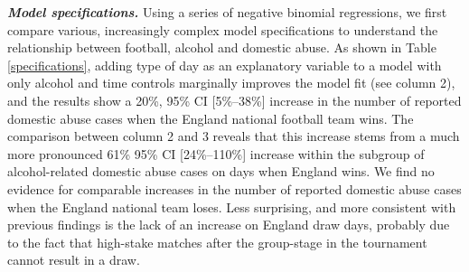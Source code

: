\documentclass[12pt, a4paper]{article}
\begin{document}
\textbf{\textit{Model specifications.}} Using a series of negative binomial regressions, we first compare various, increasingly complex model specifications to understand the relationship between football, alcohol and domestic abuse.  As shown in Table \ref{specifications}, adding type of day as an explanatory variable to a model with only alcohol and time controls marginally improves the model fit (see column 2), and the results show a 20\%, 95\% CI [5\%--38\%] increase in the number of reported domestic abuse cases when the England national football team wins. The comparison between column 2 and 3 reveals that this increase stems from a much more pronounced 61\% 95\% CI [24\%--110\%] increase within the subgroup of alcohol-related domestic abuse cases on days when England wins. We find no evidence for comparable increases in the number of reported domestic abuse cases when the England national team loses. Less surprising, and more consistent with previous findings is the lack of an increase on England draw days, probably due to the fact that high-stake matches after the group-stage in the tournament cannot result in a draw. 
\end{document}

